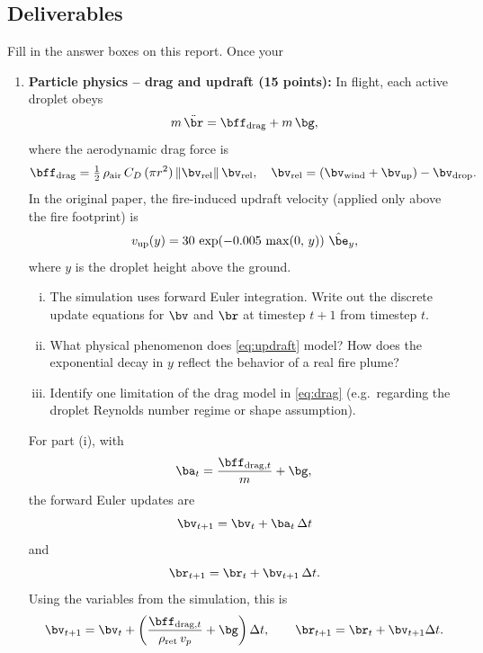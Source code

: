 \documentclass{article}
\begin{document}
\subsection*{Deliverables}
Fill in the answer boxes on this report. Once your 
\begin{enumerate}


\item[1.] \textbf{Particle physics -- drag and updraft (15 points):}
In flight, each active droplet obeys
\begin{equation}
    m\,\ddot{\br} = \bff_\text{drag} + m\,\bg,
    \label{eq:eom}
\end{equation}
where the aerodynamic drag force is
\begin{equation}
    \bff_\text{drag} = \tfrac{1}{2}\,\rho_\text{air}\,C_D\,(\pi r^2)\,\|\bv_\text{rel}\|\,\bv_\text{rel},
    \quad \bv_\text{rel} = (\bv_\text{wind} + \bv_\text{up}) - \bv_\text{drop}.
    \label{eq:drag}
\end{equation}
In the original paper, the fire-induced updraft velocity (applied only above the fire footprint) is
\begin{equation}
    v_\text{up}(y) = 30\,\exp\!\left(-0.005\,\max(0,\,y)\right)\,\hat{\be}_y,
    \label{eq:updraft}
\end{equation}
where $y$ is the droplet height above the ground.

\begin{enumerate}[(i)]
    \item The simulation uses forward Euler integration. Write out the discrete update equations for $\bv$ and $\br$ at timestep $t+1$ from timestep $t$.
    \item What physical phenomenon does \cref{eq:updraft} model? How does the exponential decay in $y$ reflect the behavior of a real fire plume?
    \item Identify one limitation of the drag model in \cref{eq:drag} (e.g.\ regarding the droplet Reynolds number regime or shape assumption).
\end{enumerate}

\begin{answer}
For part (i), with
\[
\ba_t = \frac{\bff_{\text{drag},t}}{m} + \bg,
\]
the forward Euler updates are
\[
\bv_{t+1} = \bv_t + \ba_t \,\Delta t
\]
and
\[
\br_{t+1} = \br_t + \bv_{t+1}\,\Delta t.
\]
Using the variables from the simulation, this is
\[
\bv_{t+1} = \bv_t + \left(\frac{\bff_{\text{drag},t}}{\rho_{\text{ret}}\,v_p} + \bg\right)\Delta t,
\qquad
\br_{t+1} = \br_t + \bv_{t+1}\Delta t.
\]


\end{answer}
\end{enumerate}
\end{document}
